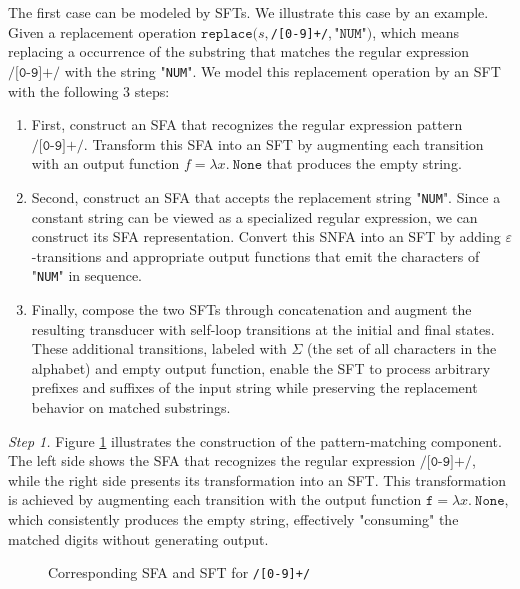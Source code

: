 \documentclass[a4paper,UKenglish,cleveref, autoref, anonymous, thm-restate]{lipics-v2021}
\begin{document}
The first case can be modeled by SFTs. We illustrate this case by an example. Given a replacement operation $\texttt{replace}(s, $\texttt{/[0-9]+/}$, $"$\texttt{NUM}$"$)$, which means replacing a occurrence of the substring that matches the regular expression $\texttt{/[0-9]+/}$ with the string "\texttt{NUM}".
We model this replacement operation by an SFT with the following 3 steps:

\begin{enumerate}
  \item First, construct an SFA that recognizes the regular expression pattern $\texttt{/[0-9]+/}$. Transform this SFA into an SFT by augmenting each transition with an output function $f = \lambda x.~\texttt{None}$ that produces the empty string. 
  \item Second, construct an SFA that accepts the replacement string "\texttt{NUM}". Since a constant string can be viewed as a specialized regular expression, we can construct its SFA representation. Convert this SNFA into an SFT by adding $\varepsilon$-transitions  and appropriate output functions that emit the characters of "\texttt{NUM}" in sequence.
  \item Finally, compose the two SFTs through concatenation and augment the resulting transducer with self-loop transitions at the initial and final states. These additional transitions, labeled with $\Sigma$ (the set of all characters in the alphabet) and empty output function, enable the SFT to process arbitrary prefixes and suffixes of the input string while preserving the replacement behavior on matched substrings.
\end{enumerate}


\noindent\emph{Step 1.}
Figure \ref{fig-snfa-pattern} illustrates the construction of the pattern-matching component. The left side shows the SFA that recognizes the regular expression $\texttt{/[0-9]+/}$, while the right side presents its transformation into an SFT. This transformation is achieved by augmenting each transition with the output function $\texttt{f} = \lambda x.~\texttt{None}$, which consistently produces the empty string, effectively "consuming" the matched digits without generating output.





\begin{figure}[h] \centering
{}
\caption{Corresponding SFA and SFT for \texttt{/[0-9]+/}}
\label{fig-snfa-pattern}
\end{figure}
\end{document}
